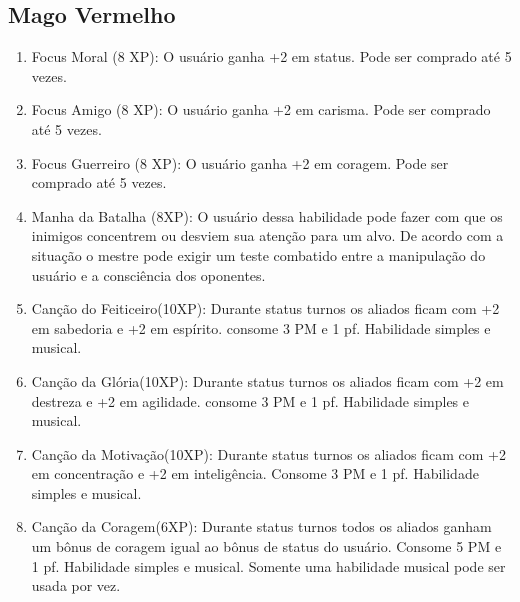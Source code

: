   \subsection{Mago Vermelho}    
  	
\begin{enumerate}
  	\item Focus Moral (8 XP): O usuário ganha +2 em status. Pode ser comprado até 5 vezes.
  
  	\item Focus Amigo (8 XP): O usuário ganha +2 em carisma. Pode ser comprado até 5 vezes.
  
  	\item Focus Guerreiro (8 XP): O usuário ganha +2 em coragem. Pode ser comprado até 5 vezes.
  
		\item Manha da Batalha (8XP):  O usuário dessa habilidade pode fazer com que os inimigos concentrem ou desviem sua atenção para um alvo. De acordo com a situação o mestre pode exigir um teste combatido entre a manipulação do usuário e a consciência dos oponentes.

		\item Canção do Feiticeiro(10XP): Durante status turnos os aliados ficam com +2 em sabedoria e +2 em espírito. consome 3 PM e 1 pf. Habilidade simples e musical. %
	
		\item Canção da Glória(10XP): Durante status turnos os aliados ficam com +2 em destreza e +2 em agilidade. consome 3 PM e 1 pf. Habilidade simples e musical. %
		
		\item Canção da Motivação(10XP): Durante status turnos os aliados ficam com +2 em concentração e +2 em inteligência. Consome 3 PM e 1 pf. Habilidade simples e musical. %
		
		\item Canção da Coragem(6XP): Durante status turnos todos os aliados ganham um bônus de coragem igual ao bônus de status do usuário. Consome 5 PM e 1 pf. Habilidade simples e musical. Somente uma habilidade musical pode ser usada por vez.
	

\end{enumerate}
